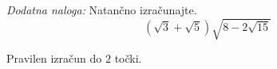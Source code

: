 \documentclass[addpoints,12pt]{exam}
\begin{document}
\begin{questions}









      \newpage

    \bonusquestion[3]
    \textit{Dodatna naloga:} Natančno izračunajte. $$ \left(\sqrt{3}+\sqrt{5}\right)\sqrt{8-2\sqrt{15}} $$

    \begin{solution}[5cm]
        Pravilen izračun do $2$ točki.
    \end{solution}




\end{questions}
\end{document}
